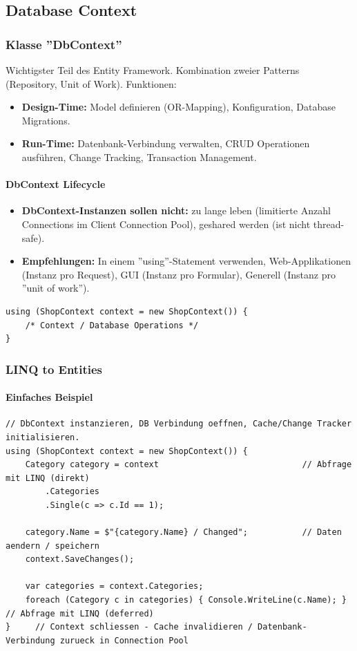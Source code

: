\documentclass[
a4paper,
oneside,
10pt,
fleqn,
headsepline,
toc=listofnumbered, 
bibliography=totocnumbered]{scrartcl}
\begin{document}
\subsection{Database Context}
\subsubsection{Klasse ''DbContext''}
Wichtigster Teil des Entity Framework. Kombination zweier Patterns (Repository, Unit of Work). Funktionen:
\begin{itemize}
	\item \textbf{Design-Time:} Model definieren (OR-Mapping), Konfiguration, Database Migrations.
	\item \textbf{Run-Time:} Datenbank-Verbindung verwalten, CRUD Operationen ausführen, Change Tracking, Transaction Management.
\end{itemize}

\paragraph{DbContext Lifecycle}
\begin{itemize}
	\item \textbf{DbContext-Instanzen sollen nicht:} zu lange leben (limitierte Anzahl Connections im Client Connection Pool), geshared werden (ist nicht thread-safe).
	\item \textbf{Empfehlungen:} In einem ''using''-Statement verwenden, Web-Applikationen (Instanz pro Request), GUI (Instanz pro Formular), Generell (Instanz pro ''unit of work'').
\end{itemize}

\begin{lstlisting}
using (ShopContext context = new ShopContext()) {
    /* Context / Database Operations */
}
\end{lstlisting}

\subsubsection{LINQ to Entities}
\paragraph{Einfaches Beispiel}
\begin{lstlisting} 
// DbContext instanzieren, DB Verbindung oeffnen, Cache/Change Tracker initialisieren.
using (ShopContext context = new ShopContext()) {          
    Category category = context                             // Abfrage mit LINQ (direkt)
        .Categories
        .Single(c => c.Id == 1);
        
    category.Name = $"{category.Name} / Changed";           // Daten aendern / speichern 
    context.SaveChanges();
    
    var categories = context.Categories;
    foreach (Category c in categories) { Console.WriteLine(c.Name); }       // Abfrage mit LINQ (deferred)
}     // Context schliessen - Cache invalidieren / Datenbank-Verbindung zurueck in Connection Pool
\end{lstlisting}
\end{document}
